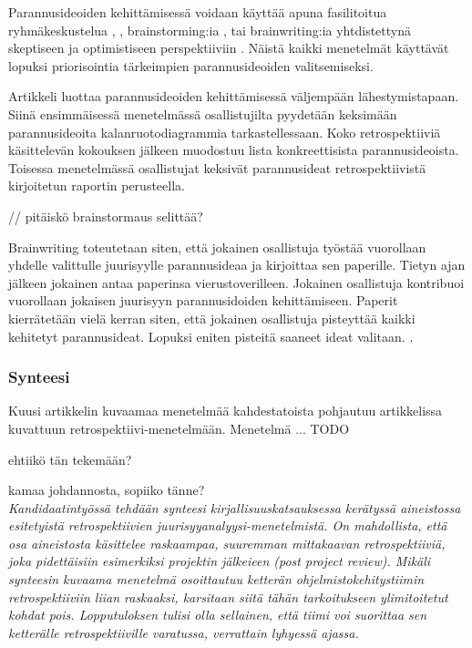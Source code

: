 Parannusideoiden kehittämisessä voidaan käyttää apuna fasilitoitua ryhmäkeskustelua \citep{card1998learning}, \citep{karlsson2006case}, brainstorming:ia \citep{staalhane2004root}, tai brainwriting:ia yhtdistettynä skeptiseen ja optimistiseen perspektiiviin \citep{Lehtinen2011}. Näistä kaikki menetelmät käyttävät lopuksi priorisointia tärkeimpien parannusideoiden valitsemiseksi. 

Artikkeli \citep{staalhane2003post} luottaa parannusideoiden kehittämisessä väljempään lähestymistapaan. Siinä ensimmäisessä menetelmässä osallistujilta pyydetään keksimään parannusideoita kalanruotodiagrammia tarkastellessaan. Koko retrospektiiviä käsittelevän kokouksen jälkeen muodostuu lista konkreettisista parannusideoista. Toisessa menetelmässä osallistujat keksivät parannusideat retrospektiivistä kirjoitetun raportin perusteella. \citep{staalhane2003post}

// pitäiskö brainstormaus selittää?

Brainwriting toteutetaan siten, että jokainen osallistuja työstää vuorollaan yhdelle valittulle juurisyylle parannusideaa ja kirjoittaa sen paperille. Tietyn ajan jälkeen jokainen antaa paperinsa vierustoverilleen. Jokainen osallistuja kontribuoi vuorollaan jokaisen juurisyyn parannusidoiden kehittämiseen. Paperit kierrätetään vielä kerran siten, että jokainen osallistuja pisteyttää kaikki kehitetyt parannusideat. Lopuksi eniten pisteitä saaneet ideat valitaan. \citep{Lehtinen2011}.

\subsubsection{Synteesi}
Kuusi artikkelin kuvaamaa menetelmää kahdestatoista pohjautuu artikkelissa \citep{birk2002postmortem} kuvattuun retrospektiivi-menetelmään. Menetelmä ... TODO

ehtiikö tän tekemään?

kamaa johdannosta, sopiiko tänne?\\
\textit{Kandidaatintyössä tehdään synteesi kirjallisuuskatsauksessa kerätyssä aineistossa esitetyistä retrospektiivien juurisyyanalyysi-menetelmistä. On mahdollista, että osa aineistosta käsittelee raskaampaa, suuremman mittakaavan retrospektiiviä, joka pidettäisiin esimerkiksi projektin jälkeieen (post project review). Mikäli synteesin kuvaama menetelmä osoittautuu ketterän ohjelmistokehitystiimin retrospektiiviin liian raskaaksi, karsitaan siitä tähän tarkoitukseen ylimitoitetut kohdat pois. Lopputuloksen tulisi olla sellainen, että tiimi voi suorittaa sen ketterälle retrospektiiville varatussa, verrattain lyhyessä ajassa.}



